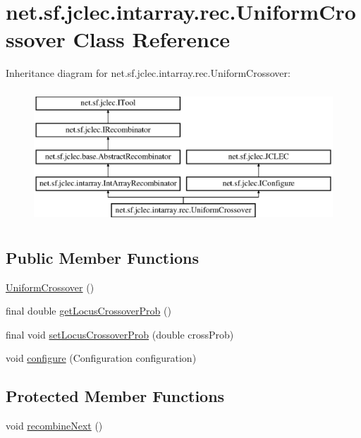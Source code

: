 \hypertarget{classnet_1_1sf_1_1jclec_1_1intarray_1_1rec_1_1_uniform_crossover}{\section{net.\-sf.\-jclec.\-intarray.\-rec.\-Uniform\-Crossover Class Reference}
\label{classnet_1_1sf_1_1jclec_1_1intarray_1_1rec_1_1_uniform_crossover}
}
Inheritance diagram for net.\-sf.\-jclec.\-intarray.\-rec.\-Uniform\-Crossover\-:\begin{figure}[H]
\begin{center}
\leavevmode
\includegraphics[height=5.000000cm]{classnet_1_1sf_1_1jclec_1_1intarray_1_1rec_1_1_uniform_crossover}
\end{center}
\end{figure}
\subsection*{Public Member Functions}
\begin{DoxyCompactItemize}
\item 
\hyperlink{classnet_1_1sf_1_1jclec_1_1intarray_1_1rec_1_1_uniform_crossover_ab659e73da7f79c9305233c71bceb6adf}{Uniform\-Crossover} ()
\item 
final double \hyperlink{classnet_1_1sf_1_1jclec_1_1intarray_1_1rec_1_1_uniform_crossover_a17e779376c89ed32fa30d466a9b4aa02}{get\-Locus\-Crossover\-Prob} ()
\item 
final void \hyperlink{classnet_1_1sf_1_1jclec_1_1intarray_1_1rec_1_1_uniform_crossover_a199c447c70af7affadaf1bbf4811f380}{set\-Locus\-Crossover\-Prob} (double cross\-Prob)
\item 
void \hyperlink{classnet_1_1sf_1_1jclec_1_1intarray_1_1rec_1_1_uniform_crossover_a352e453cdfb735b5e0638a3252683f6c}{configure} (Configuration configuration)
\end{DoxyCompactItemize}
\subsection*{Protected Member Functions}
\begin{DoxyCompactItemize}
\item 
void \hyperlink{classnet_1_1sf_1_1jclec_1_1intarray_1_1rec_1_1_uniform_crossover_a497ea31c7864b8fa7a8a3db876ff9cbd}{recombine\-Next} ()
\end{DoxyCompactItemize}
